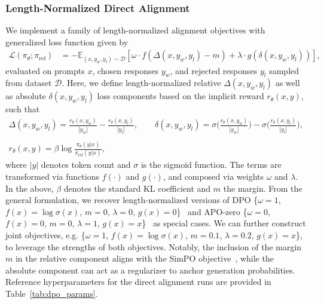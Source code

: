 \documentclass{article}
\begin{document}
\subsubsection{Length-Normalized Direct Alignment}
\label{sec:apo_algo}
We implement a family of length-normalized alignment objectives with generalized loss function given by
\begin{align}
\mathcal{L}(\pi_\theta; \pi_{\text{ref}}) &= -\mathbb{E}_{(x,y_w,y_l)\sim\mathcal{D}} \left[ \omega \cdot f \left(\Delta(x,y_w,y_l)-m\right) + \lambda \cdot g\left(\delta(x,y_w,y_l)\right)\right],
\end{align}
evaluated on prompts $x$, chosen responses $y_w$, and rejected responses $y_l$ sampled from dataset $\mathcal{D}$.
Here, we define length-normalized relative $\Delta(x,y_w,y_l)$ as well as absolute $\delta(x,y_w,y_l)$ loss components based on the implicit reward $r_\theta\left(x,y\right)$, such that
\begin{gather}
    \Delta(x,y_w,y_l)=\frac{r_\theta(x,y_w)}{|y_w|} - \frac{r_\theta(x,y_l)}{|y_l|}, \qquad
    \delta(x,y_w,y_l)=\sigma\bigg(\frac{r_\theta(x,y_w)}{|y_w|}\bigg) - \sigma\bigg(\frac{r_\theta(x,y_l)}{|y_l|}\bigg), \\ \nonumber\\ r_\theta\left(x,y\right)=\beta\log\frac{\pi_\theta\left(y|x\right)}{\pi_\text{ref}\left(y|x\right)},
\end{gather}
where $|y|$ denotes token count and $\sigma$ is the sigmoid function. The terms are transformed via functions $f(\cdot)$ and $g(\cdot)$, and composed via weights $\omega$ and $\lambda$. In the above, $\beta$ denotes the standard KL coefficient and $m$ the margin. From the general formulation, we recover length-normalized versions of DPO \{$\omega=1$, $f(x)=\log\sigma(x)$, $m=0$, $\lambda=0$, $g(x)=0$\}~\citep{rafailov2023direct} and APO-zero \{$\omega=0$, $f(x)=0$, $m=0$, $\lambda=1$, $g(x)=x$\}~\citep{d2025anchored} as special cases. We can further construct joint objectives, e.g. \{$\omega=1$, $f(x)=\log\sigma(x)$, $m=0.1$, $\lambda=0.2$, $g(x)=x$\}, to leverage the strengths of both objectives. Notably, the inclusion of the margin $m$ in the relative component aligns with the SimPO objective~\citep{meng2024simpo}, while the absolute component can act as a regularizer to anchor generation probabilities. Reference hyperparameters for the direct alignment runs are provided in Table~\ref{tab:dpo_params}.
\end{document}
